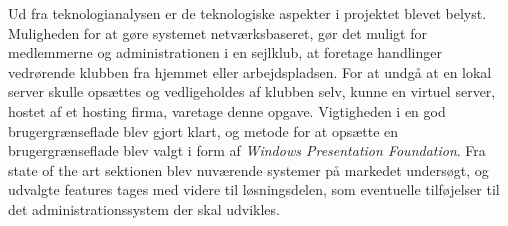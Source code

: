 Ud fra teknologianalysen er de teknologiske aspekter i projektet blevet belyst. 
Muligheden for at gøre systemet netværksbaseret, gør det muligt for medlemmerne og administrationen i en sejlklub, at foretage handlinger vedrørende klubben fra hjemmet eller arbejdspladsen. 
For at undgå at en lokal server skulle opsættes og vedligeholdes af klubben selv, kunne en virtuel server, hostet af et hosting firma, varetage denne opgave. 
Vigtigheden i en god brugergrænseflade blev gjort klart, og metode for at opsætte en brugergrænseflade
blev valgt i form af \textit{Windows Presentation Foundation}. 
Fra state of the art sektionen blev nuværende systemer på markedet undersøgt, og udvalgte features tages med videre til løsningsdelen, som eventuelle tilføjelser til det
administrationssystem der skal udvikles.


